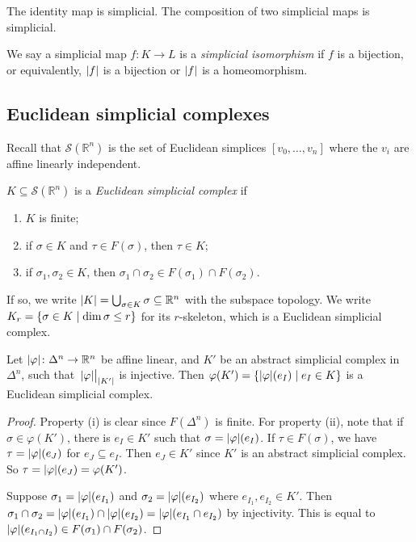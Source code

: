 \begin{remark}
	The identity map is simplicial.
	The composition of two simplicial maps is simplicial.
\end{remark}
\begin{definition}
	We say a simplicial map \( f \colon K \to L \) is a \emph{simplicial isomorphism} if \( f \) is a bijection, or equivalently, \( \abs{f} \) is a bijection or \( \abs{f} \) is a homeomorphism.
\end{definition}

\subsection{Euclidean simplicial complexes}
Recall that \( \mathcal S(\mathbb R^n) \) is the set of Euclidean simplices \( [v_0, \dots, v_n] \) where the \( v_i \) are affine linearly independent.
\begin{definition}
	\( K \subseteq \mathcal S(\mathbb R^n) \) is a \emph{Euclidean simplicial complex} if
	\begin{enumerate}
		\item \( K \) is finite;
		\item if \( \sigma \in K \) and \( \tau \in F(\sigma) \), then \( \tau \in K \);
		\item if \( \sigma_1, \sigma_2 \in K \), then \( \sigma_1 \cap \sigma_2 \in F(\sigma_1) \cap F(\sigma_2) \).
	\end{enumerate}
	If so, we write \( \abs{K} = \bigcup_{\sigma \in K} \sigma \subseteq \mathbb R^n \) with the subspace topology.
	We write \( K_r = \qty{\sigma \in K \mid \dim \sigma \leq r} \) for its \( r \)-skeleton, which is a Euclidean simplicial complex.
\end{definition}
\begin{proposition}
	Let \( \abs{\varphi} \colon \Delta^n \to \mathbb R^n \) be affine linear, and \( K' \) be an abstract simplicial complex in \( \Delta^n \), such that \( \eval{\abs{\varphi}}_{\abs{K'}} \) is injective.
	Then \( \varphi(K') = \qty{\abs{\varphi}(e_I) \mid e_I \in K} \) is a Euclidean simplicial complex.
\end{proposition}
\begin{proof}
	Property (i) is clear since \( F(\Delta^n) \) is finite.
	For property (ii), note that if \( \sigma \in \varphi(K') \), there is \( e_I \in K' \) such that \( \sigma = \abs{\varphi}(e_I) \).
	If \( \tau \in F(\sigma) \), we have \( \tau = \abs{\varphi}(e_J) \) for \( e_J \subseteq e_I \).
	Then \( e_J \in K' \) since \( K' \) is an abstract simplicial complex.
	So \( \tau = \abs{\varphi}(e_J) = \varphi(K') \).

	Suppose \( \sigma_1 = \abs{\varphi}(e_{I_1}) \) and \( \sigma_2 = \abs{\varphi}(e_{I_2}) \) where \( e_{I_1}, e_{I_2} \in K' \).
	Then \( \sigma_1 \cap \sigma_2 = \abs{\varphi}(e_{I_1}) \cap \abs{\varphi}(e_{I_2}) = \abs{\varphi}(e_{I_1} \cap e_{I_2}) \) by injectivity.
	This is equal to \( \abs{\varphi}(e_{I_1 \cap I_2}) \in F(\sigma_1) \cap F(\sigma_2) \).
\end{proof}
